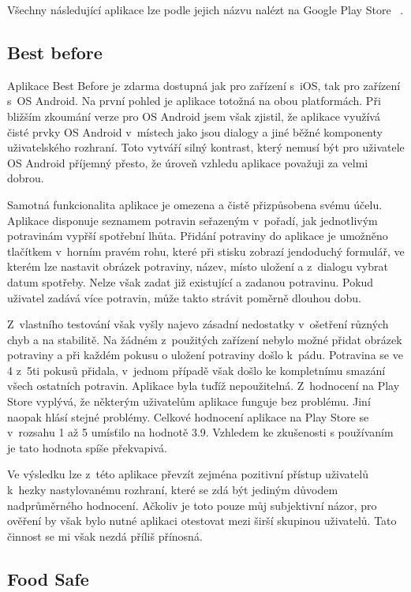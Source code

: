 \documentclass[thesis=B,czech]{FITthesis}[2013/10/20]
\begin{document}
Všechny následující aplikace lze podle jejich názvu nalézt na Google Play Store ~\cite{play_store}.

\subsection{Best before}

Aplikace Best Before je zdarma dostupná jak pro zařízení s~iOS, tak pro zařízení s~OS Android. Na první pohled je aplikace totožná na obou platformách. Při bližším zkoumání verze pro OS Android jsem však zjistil, že aplikace využívá čisté prvky OS Android v~místech jako jsou dialogy a jiné běžné komponenty uživatelského rozhraní. Toto vytváří silný kontrast, který nemusí být pro uživatele OS Android příjemný přesto, že úroveň vzhledu aplikace považuji za velmi dobrou.

Samotná funkcionalita aplikace je omezena a čistě přizpůsobena svému účelu. Aplikace disponuje seznamem potravin seřazeným v~pořadí, jak jednotlivým potravinám vypřší spotřební lhůta. Přidání potraviny do aplikace je umožněno tlačítkem v~horním pravém rohu, které při stisku zobrazí jendoduchý formulář, ve kterém lze nastavit obrázek potraviny, název, místo uložení a z~dialogu vybrat datum spotřeby. Nelze však zadat již existující a zadanou potravinu. Pokud uživatel zadává více potravin, může takto strávit poměrně dlouhou dobu.

Z~vlastního testování však vyšly najevo zásadní nedostatky v~ošetření různých chyb a na stabilitě. Na žádném z~použitých zařízení nebylo možné přidat obrázek potraviny a při každém pokusu o uložení potraviny došlo k~pádu. Potravina se ve 4 z~5ti pokusů přidala, v~jednom případě však došlo ke kompletnímu smazání všech ostatních potravin. Aplikace byla tuďíž nepoužitelná. Z~hodnocení na Play Store vyplývá, že některým uživatelům aplikace funguje bez problému. Jiní naopak hlásí stejné problémy. Celkové hodnocení aplikace na Play Store se v~rozsahu 1 až 5 umísťilo na hodnotě 3.9. Vzhledem ke zkušenosti s používaním je tato hodnota spíše překvapivá.

Ve výsledku lze z~této aplikace převzít zejména pozitivní přístup uživatelů k~hezky nastylovanému rozhraní, které se zdá být jediným důvodem nadprůměrného hodnocení. Ačkoliv je toto pouze můj subjektivní názor, pro ověření by však bylo nutné aplikaci otestovat mezi širší skupinou uživatelů. Tato činnost se mi však nezdá příliš přínosná.

\subsection{Food Safe}
\end{document}
